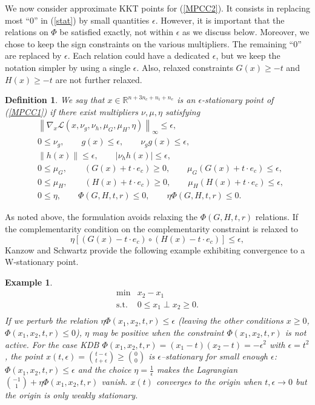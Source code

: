 \documentclass[12pt]{article}
\newtheorem{definition}{Definition}
\newtheorem{example}{Example}
\newcommand{\pref}[1]{(\ref{#1})}
\begin{document}
We now consider approximate KKT points for \pref{MPCC2}. It consists in replacing most ``0'' in \pref{stat} by small quantities $\epsilon$. However, it is important that the relations on $\Phi$ be satisfied exactly, not within $\epsilon$ as we discuss below. Moreover, we chose to keep the sign constraints on the various multipliers. The remaining ``0'' are replaced by $\epsilon$. Each relation could have a dedicated $\epsilon$, but we keep the notation simpler by using a single $\epsilon$. Also, relaxed constraints $G(x)\ge -t$ and $H(x)\ge -t$ are not further relaxed.
\begin{definition}\label{def:EpsSol}
We say that $x\in\mathbb{R}^{n+3n_c+n_i+n_e}$ is an $\epsilon$-stationary point of (\ref{MPCC1}) if there exist multipliers $\nu,\mu,\eta$ satisfying
\begin{equation}\label{epstat}
\begin{array}{cl}
&\left\|\nabla_{x}\mathcal{L}(x,\nu_g,\nu_h,\mu_{G},\mu_{H},\eta)\right\|_\infty\leq\epsilon,\\
&0\leq\nu_g,  \qquad g(x)\leq\epsilon, \qquad \nu_gg(x)\leq\epsilon,\\
&\|h(x)\|\le\epsilon,\qquad|\nu_hh(x)|\leq\epsilon,\\
&0\leq\mu_G, \qquad(G(x)+t\cdot e_c)\geq0, \qquad\mu_G(G(x)+t\cdot e_c)\leq\epsilon, \\
&0\leq\mu_H, \qquad(H(x)+t\cdot e_c)\geq0, \qquad\mu_H(H(x)+t\cdot e_c)\leq\epsilon, \\
&0\leq\eta,\qquad\Phi(G,H,t,r)\leq 0, \qquad\eta\Phi(G,H,t,r)\leq0.
\end{array}
\end{equation}
\end{definition}

As noted above, the formulation avoids relaxing the $\Phi(G,H,t,r)$ relations. If the complementarity condition on the complementarity constraint is relaxed to
\[ \eta\left[(G(x)-t\cdot e_c)\circ(H(x)-t\cdot e_c)\right]\leq\epsilon, \]
Kanzow and Schwartz provide the following example exhibiting convergence to a W-stationary point.

\begin{example}
\begin{equation}\label{MPCC_W}
 \begin{array}{ll} 
      \min &x_2-x_1\\
      \textrm{s.t.}
          &0\leq x_1\perp x_2\geq0.\\
 \end{array}
\end{equation}
If we perturb the relation $\eta\Phi(x_1,x_2,t,r)\leq\epsilon$ (leaving the other conditions $x\ge0$, $\Phi(x_1,x_2,t,r)\le0$), $\eta$ may be positive when the constraint $\Phi(x_1,x_2,t,r)$ is not active. For the case KDB $\Phi(x_1,x_2,t,r) = (x_1-t)(x_2-t)=-\epsilon^2$ with $\epsilon=t^2$, the point $x(t,\epsilon)={t-\epsilon\choose t+\epsilon}\geq{0\choose0}$ is $\epsilon$--stationary for small enough $\epsilon$: $\Phi(x_1,x_2,t,r)\le\epsilon$ and the choice $\eta=\frac1\epsilon$ makes the Lagrangian ${-1\choose1}+\eta\Phi(x_1,x_2,t,r)$ vanish. $x(t)$ converges to the origin when $t,\epsilon\longrightarrow0$ but the origin is only weakly stationary.
\end{example}
\end{document}
